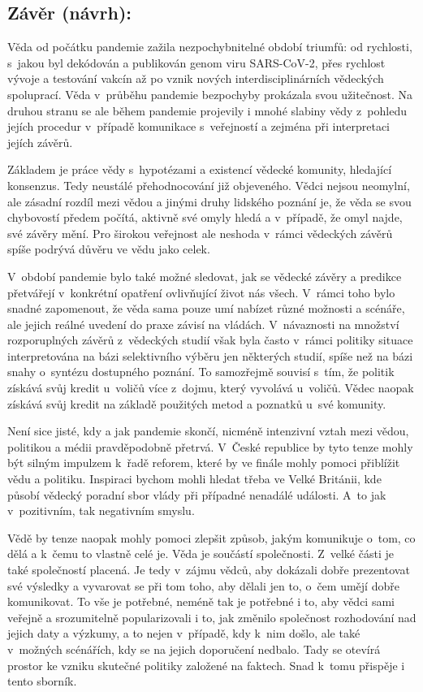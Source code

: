 \subsection*{Závěr (návrh):}

Věda od počátku pandemie zažila nezpochybnitelné období triumfů: od rychlosti, s~jakou byl dekódován a publikován genom viru SARS-CoV-2, přes rychlost vývoje a testování vakcín až po vznik nových interdisciplinárních vědeckých spoluprací. Věda v~průběhu pandemie bezpochyby prokázala svou užitečnost. Na druhou stranu se ale během pandemie projevily i mnohé slabiny vědy z~pohledu jejích procedur v~případě komunikace s~veřejností a zejména při interpretaci jejích závěrů.

Základem je práce vědy s~hypotézami a existencí vědecké komunity, hledající konsenzus. Tedy neustálé přehodnocování již objeveného. Vědci nejsou neomylní, ale zásadní rozdíl mezi vědou a jinými druhy lidského poznání je, že věda se svou chybovostí předem počítá, aktivně své omyly hledá a v~případě, že omyl najde, své závěry mění. Pro širokou veřejnost ale neshoda v~rámci vědeckých závěrů spíše podrývá důvěru ve vědu jako celek.

V~období pandemie bylo také možné sledovat, jak se vědecké závěry a predikce přetvářejí v~konkrétní opatření ovlivňující život nás všech. V~rámci toho bylo snadné zapomenout, že věda sama pouze umí nabízet různé možnosti a scénáře, ale jejich reálné uvedení do praxe závisí na vládách. V~návaznosti na množství rozporuplných závěrů z~vědeckých studií však byla často v~rámci politiky situace interpretována na bázi selektivního výběru jen některých studií, spíše než na bázi snahy o~syntézu dostupného poznání. To samozřejmě souvisí s~tím, že politik získává svůj kredit u~voličů více z~dojmu, který vyvolává u~voličů. Vědec naopak získává svůj kredit na základě použitých metod a poznatků u~své komunity.

Není sice jisté, kdy a jak pandemie skončí, nicméně intenzivní vztah mezi vědou, politikou a médii pravděpodobně přetrvá. V~České republice by tyto tenze mohly být silným impulzem k~řadě reforem, které by ve finále mohly pomoci přiblížit vědu a politiku. Inspiraci bychom mohli hledat třeba ve Velké Británii, kde působí vědecký poradní sbor vlády při případné nenadálé události. A~to jak v~pozitivním, tak negativním smyslu.

Vědě by tenze naopak mohly pomoci zlepšit způsob, jakým komunikuje o~tom, co dělá a k~čemu to vlastně celé je. Věda je součástí společnosti. Z~velké části je také společností placená. Je tedy v~zájmu vědců, aby dokázali dobře prezentovat své výsledky a vyvarovat se při tom toho, aby dělali jen to, o~čem umějí dobře komunikovat. To vše je potřebné, neméně tak je potřebné i to, aby vědci sami veřejně a srozumitelně popularizovali i to, jak změnilo společnost rozhodování nad jejich daty a výzkumy, a to nejen v~případě, kdy k~nim došlo, ale také v~možných scénářích, kdy se na jejich doporučení nedbalo. Tady se otevírá prostor ke vzniku skutečné politiky založené na faktech. Snad k~tomu přispěje i tento sborník.

